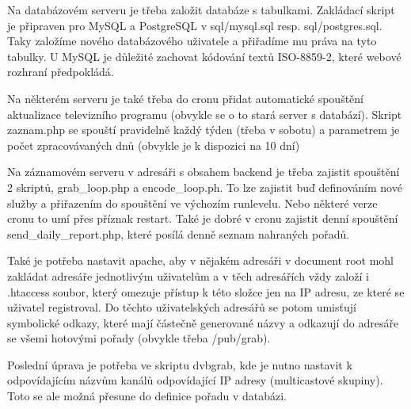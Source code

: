 \vspace{10pt}

Na databázovém serveru je třeba založit databáze s tabulkami. Zakládací skript je připraven pro MySQL a PostgreSQL v sql/mysql.sql resp. sql/postgres.sql. Taky založíme nového databázového uživatele a přiřadíme mu práva na tyto tabulky. U MySQL je důležité zachovat kódování textů ISO-8859-2, které webové rozhraní předpokládá.

\vspace{10pt}

Na některém serveru je také třeba do cronu přidat automatické spouštění aktualizace televizního programu (obvykle se o to stará server s databází). Skript zaznam.php se spouští pravidelně každý týden (třeba v sobotu) a parametrem je počet zpracovávaných dnů (obvykle je k dispozici na 10 dní) 

\vspace{10pt}

Na záznamovém serveru v adresáři s obsahem backend je třeba zajistit spouštění 2 skriptů, grab\_loop.php a encode\_loop.ph. To lze zajistit buď definováním nové služby a přiřazením do spouštění ve výchozím runlevelu. Nebo některé verze cronu to umí přes příznak restart. Také je dobré v cronu zajistit denní spouštění send\_daily\_report.php, které posílá denně seznam nahraných pořadů.

\vspace{10pt}

Také je potřeba nastavit apache, aby v nějakém adresáři v document root mohl zakládat adresáře jednotlivým uživatelům a v těch adresářích vždy založí i .htaccess soubor, který omezuje přístup k této složce jen na IP adresu, ze které se uživatel registroval. Do těchto uživatelských adresářů se potom umisťují symbolické odkazy, které mají částečně generované názvy a odkazují do adresáře se všemi hotovými pořady (obvykle třeba /pub/grab).

\vspace{10pt}

Poslední úprava je potřeba ve skriptu dvbgrab, kde je nutno nastavit k odpovídajícím názvům kanálů odpovídající IP adresy (multicastové skupiny). Toto se ale možná přesune do definice pořadu v databázi.

\vspace{10pt}

